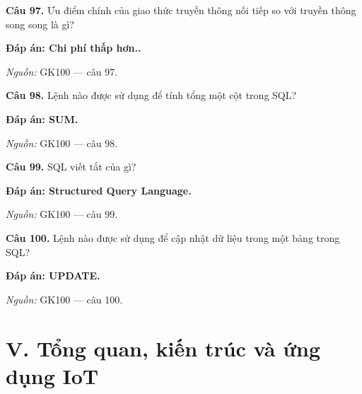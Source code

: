 \documentclass[11pt,a4paper]{article}
\begin{document}
\textbf{Câu 97.} Ưu điểm chính của giao thức truyền thông nối tiếp so với truyền thông song song là gì?\par
{\color{answer}\textbf{Đáp án: Chi phí thấp hơn..}}\par
{\footnotesize\color{sourcegray}\textit{Nguồn:} GK100 — câu 97.\par}
\vspace{3pt}\par\noindent{\color{black!18}\rule{\linewidth}{0.3pt}}\par\medskip

\textbf{Câu 98.} Lệnh nào được sử dụng để tính tổng một cột trong SQL?\par
{\color{answer}\textbf{Đáp án: SUM.}}\par
{\footnotesize\color{sourcegray}\textit{Nguồn:} GK100 — câu 98.\par}
\vspace{3pt}\par\noindent{\color{black!18}\rule{\linewidth}{0.3pt}}\par\medskip

\textbf{Câu 99.} SQL viết tắt của gì?\par
{\color{answer}\textbf{Đáp án: Structured Query Language.}}\par
{\footnotesize\color{sourcegray}\textit{Nguồn:} GK100 — câu 99.\par}
\vspace{3pt}\par\noindent{\color{black!18}\rule{\linewidth}{0.3pt}}\par\medskip

\textbf{Câu 100.} Lệnh nào được sử dụng để cập nhật dữ liệu trong một bảng trong SQL?\par
{\color{answer}\textbf{Đáp án: UPDATE.}}\par
{\footnotesize\color{sourcegray}\textit{Nguồn:} GK100 — câu 100.\par}
\vspace{3pt}\par\noindent{\color{black!18}\rule{\linewidth}{0.3pt}}\par\medskip

\section*{V. Tổng quan, kiến trúc và ứng dụng IoT}
\end{document}
